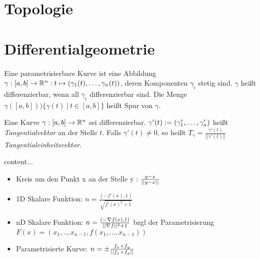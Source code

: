 \pagebreak


\section{Topologie}

\pagebreak


\section{Differentialgeometrie}


\begin{definition}
	Eine parametrisierbare Kurve ist eine Abbildung $\gamma : [a, b] \rightarrow \mathbb{R}^n : t \mapsto (\gamma_1(t), \dots, \gamma_n(t))$, deren Komponenten $\gamma_i$ stetig sind. $\gamma$ heißt differenzierbar, wenn all $\gamma_i$ differenzierbar sind. Die Menge $\gamma([a,b]) ) \{\gamma(t) \medspace | \medspace t \in [a,b] \}$ heißt Spur von $\gamma$.
\end{definition}

\begin{definition}[Tangentialvektor]
	Eine Kurve $\gamma : [a,b] \rightarrow \mathbb{R}^n$ sei differenzierbar. $\gamma'(t) := (\gamma'_1, \dots, \gamma'_n)$ heißt \emph{Tangentialvektor} an der Stelle $t$. Falls $\gamma'(t) \neq 0$, so heißt $T_\gamma = \frac{\gamma'(t)}{||\gamma'(t)||}$ \emph{Tangentialeinheitsvektor}.
\end{definition}

\begin{definition}[Normalenvektor]
	content...
\end{definition}


\begin{satz}
	\begin{itemize}[noitemsep]
		\item Kreis um den Punkt x an der Stelle y : $\frac{y - x}{||y - x||}$
		\item 1D Skalare Funktion: $n = \frac{(-f'(x), 1)}{\sqrt{f'(x)^2 + 1}}$
		\item nD Skalare Funktion: $n = \frac{(-\nabla f(x), 1)}{ ||\nabla f||^2 + 1}$ bzgl der Parametrisierung 
		 $F(x) = (x_1, .., x_{n-1}, f(x_1, ..., x_{n-1}))$	
		\item Parametrisierte Kurve: $n = \pm \frac{f_x \times f_y}{||f_x \times f_y||}$
	\end{itemize}
\end{satz}

\pagebreak

